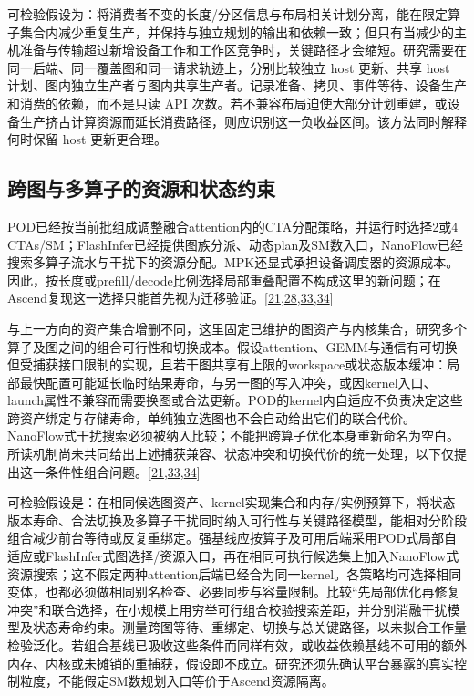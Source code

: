 \documentclass[
  UTF8,
  zihao=5]{ctexart}
\begin{document}
可检验假设为：将消费者不变的长度/分区信息与布局相关计划分离，能在限定算子集合内减少重复生产，并保持与独立规划的输出和依赖一致；但只有当减少的主机准备与传输超过新增设备工作和工作区竞争时，关键路径才会缩短。研究需要在同一后端、同一覆盖图和同一请求轨迹上，分别比较独立
host 更新、共享 host
计划、图内独立生产者与图内共享生产者。记录准备、拷贝、事件等待、设备生产和消费的依赖，而不是只读
API
次数。若不兼容布局迫使大部分计划重建，或设备生产挤占计算资源而延长消费路径，则应识别这一负收益区间。该方法同时解释何时保留
host 更新更合理。

\hypertarget{ux8de8ux56feux4e0eux591aux7b97ux5b50ux7684ux8d44ux6e90ux548cux72b6ux6001ux7ea6ux675f}{%
\subsection*{跨图与多算子的资源和状态约束}\label{ux8de8ux56feux4e0eux591aux7b97ux5b50ux7684ux8d44ux6e90ux548cux72b6ux6001ux7ea6ux675f}}

POD已经按当前批组成调整融合attention内的CTA分配策略，并运行时选择2或4
CTAs/SM；FlashInfer已经提供图族分派、动态plan及SM数入口，NanoFlow已经搜索多算子流水与干扰下的资源分配。MPK还显式承担设备调度器的资源成本。因此，按长度或prefill/decode比例选择局部重叠配置不构成这里的新问题；在Ascend复现这一选择只能首先视为迁移验证。{[}\protect\hyperlink{ref-ye2025flashinfer}{21},\protect\hyperlink{ref-cheng2026mpk}{28},\protect\hyperlink{ref-zhu2025nanoflow}{33},\protect\hyperlink{ref-kamath2025pod}{34}{]}

与上一方向的资产集合增删不同，这里固定已维护的图资产与内核集合，研究多个算子及图之间的组合可行性和切换成本。假设attention、GEMM与通信有可切换但受捕获接口限制的实现，且若干图共享有上限的workspace或状态版本缓冲：局部最快配置可能延长临时结果寿命，与另一图的写入冲突，或因kernel入口、launch属性不兼容而需要换图或合法更新。POD的kernel内自适应不负责决定这些跨资产绑定与存储寿命，单纯独立选图也不会自动给出它们的联合代价。NanoFlow式干扰搜索必须被纳入比较；不能把跨算子优化本身重新命名为空白。所读机制尚未共同给出上述捕获兼容、状态冲突和切换代价的统一处理，以下仅提出这一条件性组合问题。{[}\protect\hyperlink{ref-ye2025flashinfer}{21},\protect\hyperlink{ref-zhu2025nanoflow}{33},\protect\hyperlink{ref-kamath2025pod}{34}{]}

可检验假设是：在相同候选图资产、kernel实现集合和内存/实例预算下，将状态版本寿命、合法切换及多算子干扰同时纳入可行性与关键路径模型，能相对分阶段组合减少前台等待或反复重绑定。强基线应按算子及可用后端采用POD式局部自适应或FlashInfer式图选择/资源入口，再在相同可执行候选集上加入NanoFlow式资源搜索；这不假定两种attention后端已经合为同一kernel。各策略均可选择相同变体，也都必须做相同别名检查、必要同步与容量限制。比较``先局部优化再修复冲突''和联合选择，在小规模上用穷举可行组合校验搜索差距，并分别消融干扰模型及状态寿命约束。测量跨图等待、重绑定、切换与总关键路径，以未拟合工作量检验泛化。若组合基线已吸收这些条件而同样有效，或收益依赖基线不可用的额外内存、内核或未摊销的重捕获，假设即不成立。研究还须先确认平台暴露的真实控制粒度，不能假定SM数规划入口等价于Ascend资源隔离。
\end{document}
